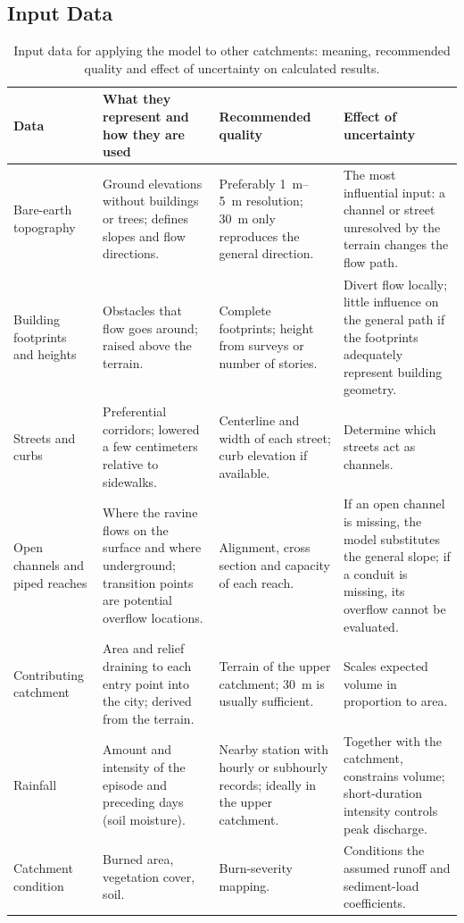 \subsection*{Input Data}
\begin{table}[htbp]\centering\small
\caption{Input data for applying the model to other catchments: meaning, recommended quality and effect of uncertainty on calculated results.}\label{tab:transferencia}
\begin{tabular}{p{}p{}p{}p{}}\toprule
Data & What they represent and how they are used & Recommended quality & Effect of uncertainty\\\midrule
Bare-earth topography & Ground elevations without buildings or trees; defines slopes and flow directions. & Preferably \SIrange{1}{5}{m} resolution; \SI{30}{m} only reproduces the general direction. & The most influential input: a channel or street unresolved by the terrain changes the flow path.\\
Building footprints and heights & Obstacles that flow goes around; raised above the terrain. & Complete footprints; height from surveys or number of stories. & Divert flow locally; little influence on the general path if the footprints adequately represent building geometry.\\
Streets and curbs & Preferential corridors; lowered a few centimeters relative to sidewalks. & Centerline and width of each street; curb elevation if available. & Determine which streets act as channels.\\
Open channels and piped reaches & Where the ravine flows on the surface and where underground; transition points are potential overflow locations. & Alignment, cross section and capacity of each reach. & If an open channel is missing, the model substitutes the general slope; if a conduit is missing, its overflow cannot be evaluated.\\
Contributing catchment & Area and relief draining to each entry point into the city; derived from the terrain. & Terrain of the upper catchment; \SI{30}{m} is usually sufficient. & Scales expected volume in proportion to area.\\
Rainfall & Amount and intensity of the episode and preceding days (soil moisture). & Nearby station with hourly or subhourly records; ideally in the upper catchment. & Together with the catchment, constrains volume; short-duration intensity controls peak discharge.\\
Catchment condition & Burned area, vegetation cover, soil. & Burn-severity mapping. & Conditions the assumed runoff and sediment-load coefficients.\\

\end{tabular}
\end{table}
